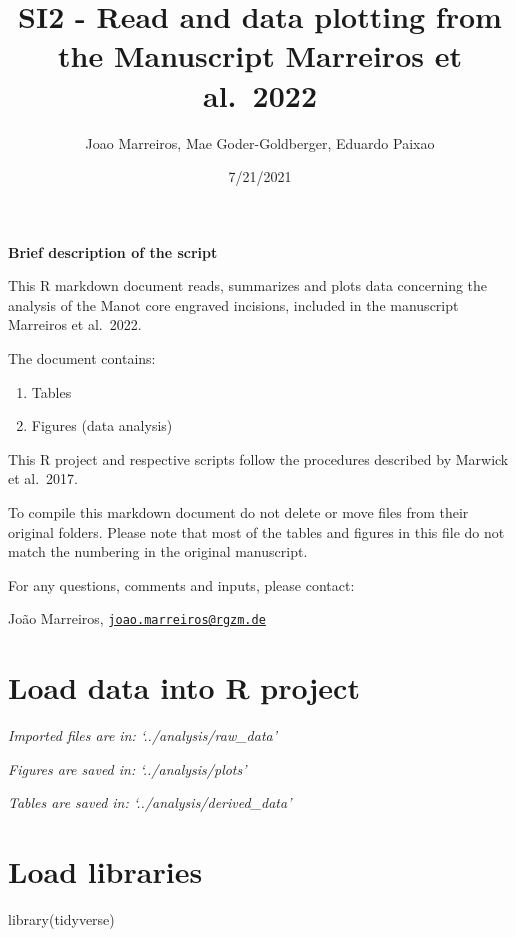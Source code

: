 \documentclass[
]{article}
\title{SI2 - Read and data plotting from the Manuscript Marreiros et
al.~2022}
\author{Joao Marreiros, Mae Goder-Goldberger, Eduardo Paixao}
\date{7/21/2021}
\newenvironment{Shaded}{\begin{snugshade}}{\end{snugshade}}
\newcommand{\FunctionTok}[1]{\textcolor[rgb]{0.00,0.00,0.00}{#1}}
\newcommand{\NormalTok}[1]{#1}
\providecommand{\tightlist}{%
  \setlength{\itemsep}{0pt}\setlength{\parskip}{0pt}}
\begin{document}
\maketitle

\textbf{Brief description of the script}

This R markdown document reads, summarizes and plots data concerning the
analysis of the Manot core engraved incisions, included in the
manuscript Marreiros et al.~2022.

The document contains:

\begin{enumerate}
\def\labelenumi{\arabic{enumi}.}
\tightlist
\item
  Tables
\item
  Figures (data analysis)
\end{enumerate}

This R project and respective scripts follow the procedures described by
Marwick et al.~2017.

To compile this markdown document do not delete or move files from their
original folders. Please note that most of the tables and figures in
this file do not match the numbering in the original manuscript.

For any questions, comments and inputs, please contact:

João Marreiros,
\href{mailto:joao.marreiros@rgzm.de}{\nolinkurl{joao.marreiros@rgzm.de}}

\hypertarget{load-data-into-r-project}{%
\section{Load data into R project}\label{load-data-into-r-project}}

\emph{Imported files are in: `../analysis/raw\_data'}

\emph{Figures are saved in: `../analysis/plots'}

\emph{Tables are saved in: `../analysis/derived\_data'}

\hypertarget{load-libraries}{%
\section{Load libraries}\label{load-libraries}}

\begin{Shaded}
\begin{Highlighting}[]
\FunctionTok{library}\NormalTok{(tidyverse)}
\end{Highlighting}
\end{Shaded}
\end{document}
